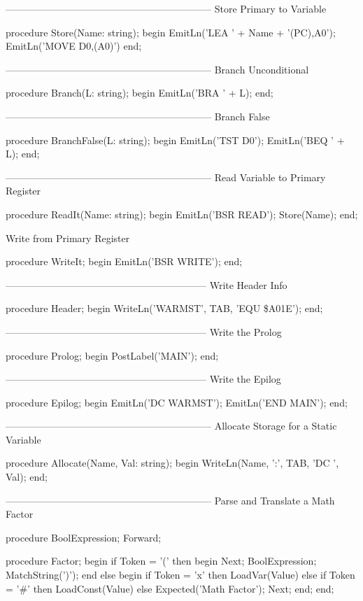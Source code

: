 \documentclass[float=false, crop=false]{standalone}
\begin{document}
\begin{code}
{---------------------------------------------------------------}
{ Store Primary to Variable }

procedure Store(Name: string);
begin
   EmitLn('LEA ' + Name + '(PC),A0');
   EmitLn('MOVE D0,(A0)')
end;


{---------------------------------------------------------------}
{ Branch Unconditional  }

procedure Branch(L: string);
begin
   EmitLn('BRA ' + L);
end;


{---------------------------------------------------------------}
{ Branch False }

procedure BranchFalse(L: string);
begin
   EmitLn('TST D0');
   EmitLn('BEQ ' + L);
end;


{---------------------------------------------------------------}
{ Read Variable to Primary Register }

procedure ReadIt(Name: string);
begin
   EmitLn('BSR READ');
   Store(Name);
end;


{ Write from Primary Register }

procedure WriteIt;
begin
   EmitLn('BSR WRITE');
end;


{--------------------------------------------------------------}
{ Write Header Info }

procedure Header;
begin
   WriteLn('WARMST', TAB, 'EQU \$A01E');
end;


{--------------------------------------------------------------}
{ Write the Prolog }

procedure Prolog;
begin
   PostLabel('MAIN');
end;


{--------------------------------------------------------------}
{ Write the Epilog }

procedure Epilog;
begin
   EmitLn('DC WARMST');
   EmitLn('END MAIN');
end;


{---------------------------------------------------------------}
{ Allocate Storage for a Static Variable }

procedure Allocate(Name, Val: string);
begin
   WriteLn(Name, ':', TAB, 'DC ', Val);
end;


{---------------------------------------------------------------}
{ Parse and Translate a Math Factor }

procedure BoolExpression; Forward;

procedure Factor;
begin
   if Token = '(' then begin
      Next;
      BoolExpression;
      MatchString(')');
      end
   else begin
      if Token = 'x' then
         LoadVar(Value)
      else if Token = '#' then
         LoadConst(Value)
      else Expected('Math Factor');
      Next;
   end;
end;



\end{code}
\end{document}

